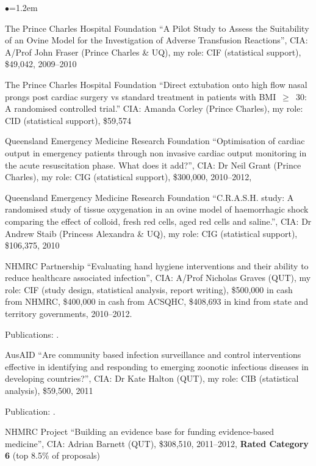 \documentclass[a4paper,11pt]{article}
\renewcommand{\labelitemi}{$\bullet$}
\begin{document}
\begin{raggedright}
\begin{list}{\labelitemi}{\leftmargin=1.2em}
\item The Prince Charles Hospital Foundation ``A Pilot Study to Assess the Suitability of an Ovine Model for the Investigation of Adverse Transfusion Reactions'', CIA: A/Prof John Fraser (Prince Charles \& UQ), my role: CIF (statistical support), \$49,042, 2009--2010

\item The Prince Charles Hospital Foundation ``Direct extubation onto high flow nasal prongs post cardiac surgery vs standard treatment in patients with BMI~$\geq$~30: A randomised controlled trial.''  CIA: Amanda Corley (Prince Charles), my role: CID (statistical support), \$59,574

\item Queensland Emergency Medicine Research Foundation ``Optimisation of cardiac output in emergency patients through non invasive cardiac output monitoring in the acute resuscitation phase. What does it add?'', CIA: Dr Neil Grant (Prince Charles), my role: CIG (statistical support), \$300,000, 2010--2012,

\item Queensland Emergency Medicine Research Foundation ``C.R.A.S.H. study: A randomised study of tissue oxygenation in an ovine model of haemorrhagic shock comparing the effect of colloid, fresh red cells, aged red cells and saline.'', CIA: Dr Andrew Staib (Princess Alexandra \& UQ), my role: CIG (statistical support), \$106,375, 2010

\item NHMRC Partnership ``Evaluating hand hygiene interventions and their ability to reduce healthcare associated infection'', CIA: A/Prof Nicholas Graves (QUT), my role: CIF (study design, statistical analysis, report writing), \$500,000 in cash from NHMRC, \$400,000 in cash from ACSQHC, \$408,693 in kind from state and territory governments, 2010--2012.

    Publications: .

\item AusAID ``Are community based infection surveillance and control interventions effective in identifying and responding to emerging zoonotic infectious diseases in developing countries?'', CIA: Dr Kate Halton (QUT), my role: CIB (statistical analysis), \$59,500, 2011

    Publication: .

\item NHMRC Project ``Building an evidence base for funding evidence-based medicine'', CIA: Adrian Barnett (QUT), \$308,510, 2011--2012, \textbf{Rated Category 6} (top 8.5\% of proposals)


\end{list}
\end{raggedright}
\end{document}
